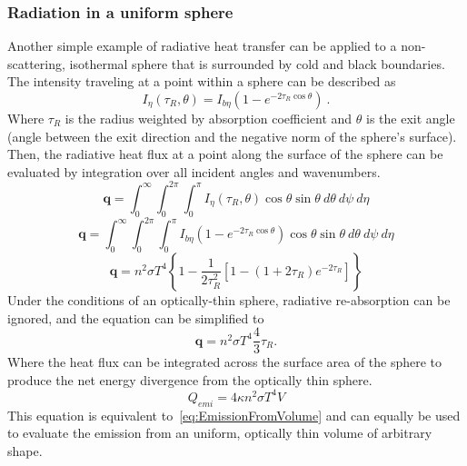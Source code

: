 \subsubsection{Radiation in a uniform sphere}
Another simple example of radiative heat transfer can be applied to a non-scattering, isothermal sphere that is surrounded by cold and black boundaries. 
The intensity traveling at a point within a sphere can be described as
\begin{equation}
    I_\eta{}(\tau{}_R,\theta{}) = I_{b\eta{}}\left(1-e^{-2\tau{}_R\cos{\theta}}\right) \ .
    \label{eq:emitting_sphere}
\end{equation}
Where $\tau{}_R$ is the radius weighted by absorption coefficient and $\theta{}$ is the exit angle (angle between the exit direction and the negative norm of the sphere's surface).
Then, the radiative heat flux at a point along the surface of the sphere can be evaluated by integration over all incident angles and wavenumbers.
\begin{equation}
    \textbf{q}=\int_0^\infty{}\int_0^{2\pi}\int_0^{\pi{}}I_\eta{}(\tau{}_R,\theta)\cos{\theta}\sin{\theta}~d\theta{}~d\psi{}~d\eta{}
    \label{eq:heatflux}
\end{equation}
\begin{equation}
    \textbf{q}=\int_0^\infty{}\int_0^{2\pi}\int_0^{\pi{}}I_{b\eta{}}\left(1-e^{-2\tau{}_R\cos{\theta}}\right)\cos{\theta}\sin{\theta}~d\theta{}~d\psi{}~d\eta{}
    \label{eq:heatflux}
\end{equation}
\begin{equation}
    \textbf{q}=n^2\sigma{}T^4\left\{1-\frac{1}{2\tau{}_R^2}\left[1-(1+2\tau{}_R)e^{-2\tau{}_R}\right]\right\}
    \label{eq:heatflux}
\end{equation}
Under the conditions of an optically-thin sphere, radiative re-absorption can be ignored, and the equation can be simplified to
\begin{equation}
    \textbf{q}=n^2\sigma{}T^4\frac{4}{3}\tau{}_R.
    \label{eq:heatflux}
\end{equation}
Where the heat flux can be integrated across the surface area of the sphere to produce the net energy divergence from the optically thin sphere.
\begin{equation}
    Q_{emi}=4\kappa{}n^2\sigma{}T^4V
    \label{eq:RadEmis}
\end{equation}
This equation is equivalent to~\ref{eq:EmissionFromVolume} and can equally be used to evaluate the emission from an uniform, optically thin volume of arbitrary shape.


